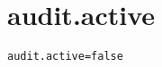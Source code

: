 \section{audit.active}
\label{configuration:AuditActive}
\AvailableInJavaOnly{\TODO}
\begin{lstlisting}[style=Props,caption={Usage example for \textit{audit.active}}]
audit.active=false
\end{lstlisting}